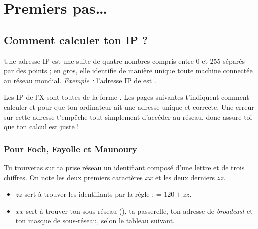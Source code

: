 \section{Premiers pas\ldots}

\subsection{Comment calculer ton IP ?}

\label{calcul_ip}

Une adresse IP est une suite de quatre nombres compris entre 0 et
255 s\'epar\'es par des points ; en gros, elle identifie de mani\`ere
unique toute machine connect\'ee au r\'eseau mondial. \emph{Exemple :}
l'adresse IP de  est .

Les IP de l'X sont toutes de la forme .
Les pages suivantes t'indiquent comment calculer  et  pour que ton
ordinateur ait une adresse unique et correcte. Une erreur sur cette adresse t'emp\^eche tout simplement d'acc\'eder au r\'eseau, donc assure-toi que ton calcul est juste !
\subsubsection{Pour Foch, Fayolle et Maunoury}
Tu trouveras sur ta prise r\'eseau un identifiant compos\'e d'une lettre et de trois chiffres.
On note les deux premiers caract\`eres $xx$ et les deux derniers $zz$.
\begin{itemize}
\item $zz$ sert \`a trouver les identifiants  par la r\`egle :  = $120 + zz$.

\item $xx$ sert \`a trouver ton sous-r\'eseau (), ta passerelle,
ton adresse de \emph{broadcast} et ton masque de sous-r\'eseau, selon le tableau suivant.
\end{itemize}

